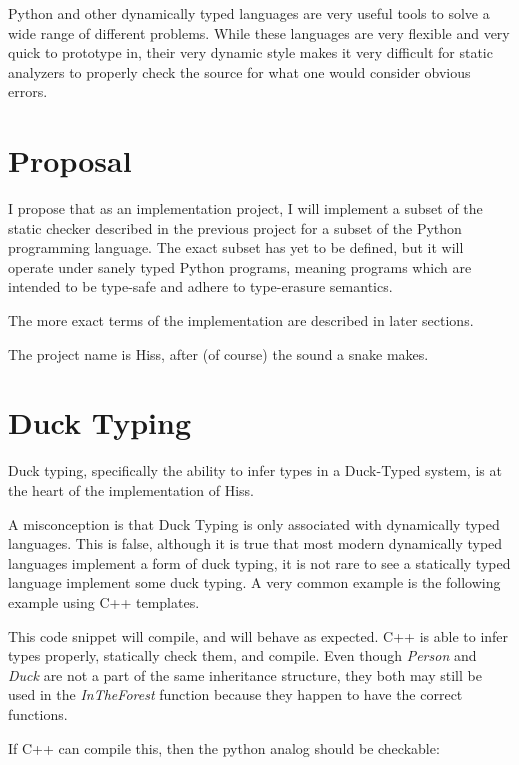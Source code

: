 \documentclass{scrartcl}
\begin{document}
\begin{multicols}{2}
Python and other dynamically typed languages are very useful tools to solve a wide
range of different problems. While these languages are very flexible and very quick
to prototype in, their very dynamic style makes it very difficult for static analyzers
to properly check the source for what one would consider obvious errors.

\section*{Proposal}

I propose that as an implementation project, I will implement a subset of the
static checker described in the previous project for a subset of the Python
programming language. The exact subset has yet to be defined, but it will
operate under sanely typed Python programs, meaning programs which are intended
to be type-safe and adhere to type-erasure semantics.

The more exact terms of the implementation are described in later sections.

The project name is Hiss, after (of course) the sound a snake makes.

\section*{Duck Typing}

Duck typing, specifically the ability to infer types in a Duck-Typed system,
is at the heart of the implementation of Hiss.

A misconception is that Duck Typing is only associated with dynamically typed
languages. This is false, although it is true that most modern dynamically typed
languages implement a form of duck typing, it is not rare to see a statically
typed language implement some duck typing. A very common example is the following
example using C++ templates.


This code snippet will compile, and will behave as expected. C++ is able
to infer types properly, statically check them, and compile. Even though
\emph{Person} and \emph{Duck} are not a part of the same inheritance structure,
they both may still be used in the \emph{InTheForest} function because they
happen to have the correct functions.

If C++ can compile this, then the python analog should be checkable:



\end{multicols}
\end{document}
